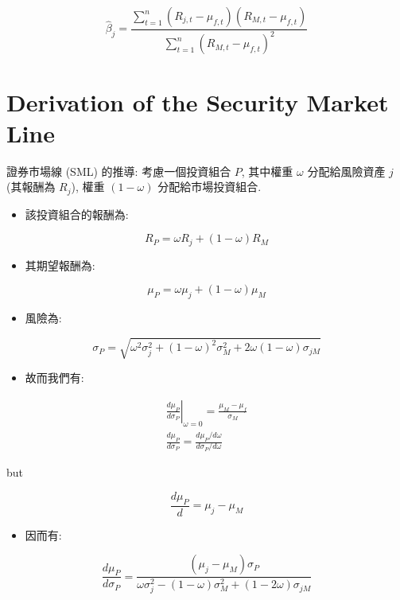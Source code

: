 \documentclass[letterpaper]{article}
\begin{document}
$$
\hat{\beta}_{j}=\frac{\sum_{t=1}^{n}\left (R_{j, t}-\mu_{f, t}\right) \left (R_{M, t}-\mu_{f, t}\right) }{\sum_{t=1}^{n}\left (R_{M, t}-\mu_{f, t}\right) ^{2}}
$$

\section*{Derivation of the Security Market Line}
證券市場線 (SML) 的推導: 考慮一個投資組合 $P$, 其中權重 $\omega$ 分配給風險資產 $j$ (其報酬為 $R_{j}$), 權重 $ (1-\omega) $ 分配給市場投資組合. 

\begin{itemize}
	\item 該投資組合的報酬為: 
\end{itemize}


$$
R_{P}=\omega R_{j}+ (1-\omega) R_{M}
$$

\begin{itemize}
	\item 其期望報酬為: 
\end{itemize}

$$
\mu_{P}=\omega \mu_{j}+ (1-\omega) \mu_{M}
$$

\begin{itemize}
  \item 風險為: 
\end{itemize}

$$
\sigma_{P}=\sqrt{\omega^{2} \sigma_{j}^{2}+ (1-\omega) ^{2} \sigma_{M}^{2}+2 \omega (1-\omega) \sigma_{j M}}
$$

\begin{itemize}
  \item 故而我們有: 
\end{itemize}

$$
\begin{gathered}
\left.\frac{d \mu_{P}}{d \sigma_{P}}\right|_{\omega=0}=\frac{\mu_{M}-\mu_{f}}{\sigma_{M}} \\
\frac{d \mu_{P}}{d \sigma_{P}}=\frac{d \mu_{P} / d \omega}{d \sigma_{P} / d \omega}
\end{gathered}
$$

but

$$
\frac{d \mu_{P}}{d}=\mu_{j}-\mu_{M}
$$


\begin{itemize}
  \item 因而有: 
\end{itemize}

$$
\frac{d \mu_{P}}{d \sigma_{P}}=\frac{\left (\mu_{j}-\mu_{M}\right) \sigma_{P}}{\omega \sigma_{j}^{2}- (1-\omega) \sigma_{M}^{2}+ (1-2 \omega) \sigma_{j M}}
$$
\end{document}
